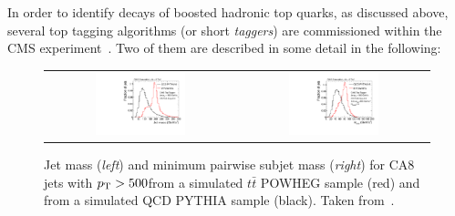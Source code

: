 In order to identify decays of boosted hadronic top quarks, as discussed above, several top tagging algorithms (or short \textit{taggers}) are commissioned within the CMS experiment~\cite{CMS:2014fya, CMS-DP-2014-036}. Two of them are described in some detail in the following:
\begin{description}
\begin{figure}[!tp]
  \centering 
  \begin{tabular}{cc}
    \includegraphics[width=0.49\textwidth]{figures/Draw2HistogramsFrom1File_QQ_MASS_CUT_PT_TT_MASS_CUT_PT_JetPt500.pdf} & 
    \includegraphics[width=0.49\textwidth]{figures/Draw2HistogramsFrom1File_QQ_MINM_CUT_PT_MASS_NSUB_TT_MINM_CUT_PT_MASS_NSUB_JetPt500.pdf}
  \end{tabular}
  \caption{Jet mass (\textit{left}) and minimum pairwise subjet mass (\textit{right}) for CA8 jets with $p_{\text{T}} > 500$\gev from a simulated $t\bar{t}$ POWHEG sample (red) and from a simulated QCD PYTHIA sample (black). Taken from~\cite{CMS:2014fya}.}
  \label{fig:boosted_top_cms_variables}
\end{figure}

\end{description}
